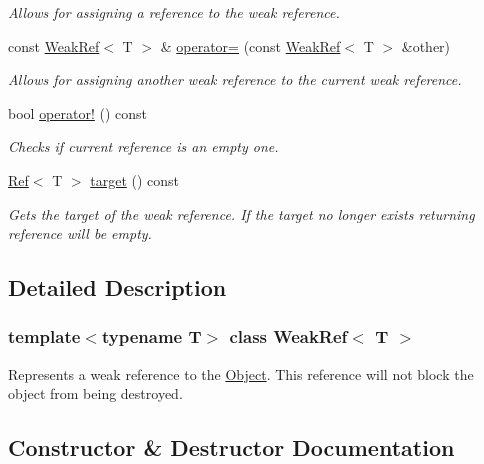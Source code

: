 \begin{DoxyCompactItemize}
\begin{DoxyCompactList}\small\item\em Allows for assigning a reference to the weak reference. \end{DoxyCompactList}\item 
const \mbox{\hyperlink{class_weak_ref}{Weak\+Ref}}$<$ T $>$ \& \mbox{\hyperlink{class_weak_ref_a647831d0f0c96e484b8fd6c22a8fb648}{operator=}} (const \mbox{\hyperlink{class_weak_ref}{Weak\+Ref}}$<$ T $>$ \&other)
\begin{DoxyCompactList}\small\item\em Allows for assigning another weak reference to the current weak reference. \end{DoxyCompactList}\item 
bool \mbox{\hyperlink{class_weak_ref_ab7bcaf37aab16bd3384bdabaf624b043}{operator!}} () const
\begin{DoxyCompactList}\small\item\em Checks if current reference is an empty one. \end{DoxyCompactList}\item 
\mbox{\hyperlink{class_ref}{Ref}}$<$ T $>$ \mbox{\hyperlink{class_weak_ref_ad6a1e1a9555c6be16f288432d58cd996}{target}} () const
\begin{DoxyCompactList}\small\item\em Gets the target of the weak reference. If the target no longer exists returning reference will be empty. \end{DoxyCompactList}\end{DoxyCompactItemize}


\subsection{Detailed Description}
\subsubsection*{template$<$typename T$>$\newline
class Weak\+Ref$<$ T $>$}

Represents a weak reference to the \mbox{\hyperlink{class_object}{Object}}. This reference will not block the object from being destroyed. 



\subsection{Constructor \& Destructor Documentation}
\mbox{\label{class_weak_ref_a911e3a2e31e3d06d035ddbf974d90522}} 
